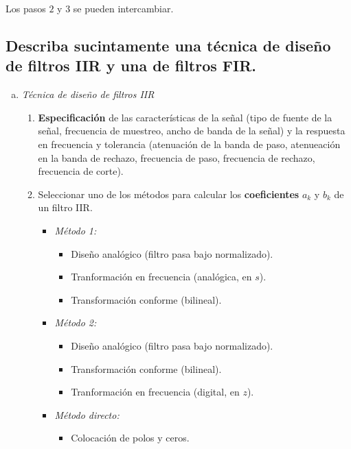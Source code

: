 \documentclass[a4paper,10pt,spanish,oneside]{article}
\begin{document}
Los pasos $2$ y $3$ se pueden intercambiar.

\subsection{Describa sucintamente una técnica de diseño de filtros IIR y una de filtros FIR.}

\begin{enumerate}[a.]
\item \textit{Técnica de diseño de filtros IIR}

\begin{enumerate}[1)]
\item \textbf{Especificación} de las características de la señal (tipo de fuente de la señal, frecuencia de muestreo, ancho de banda de la señal) y la respuesta en frecuencia y tolerancia (atenuación de la banda de paso, atenueación en la banda de rechazo, frecuencia de paso, frecuencia de rechazo, frecuencia de corte).

\item Seleccionar uno de los métodos para calcular los \textbf{coeficientes} $a_{k}$ y $b_{k}$ de un filtro IIR.

\begin{itemize}
\item \textit{Método 1:} 

\begin{itemize}
\item Diseño analógico (filtro pasa bajo normalizado).
\item Tranformación en frecuencia (analógica, en $s$).
\item Transformación conforme (bilineal).
\end{itemize}

\item \textit{Método 2:}

\begin{itemize}
\item Diseño analógico (filtro pasa bajo normalizado).
\item Transformación conforme (bilineal).
\item Tranformación en frecuencia (digital, en $z$).
\end{itemize}

\item \textit{Método directo:}

\begin{itemize}
\item Colocación de polos y ceros.
\end{itemize}


\end{itemize}
\end{enumerate}
\end{enumerate}
\end{document}
